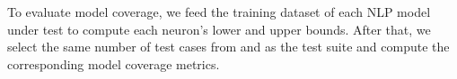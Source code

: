 To evaluate model coverage, we feed the training dataset of each NLP model under test to compute each neuron's lower and upper bounds. After that, we select the same number of test cases from \tool and \Cklst as the test suite and compute the corresponding model coverage metrics.



%
